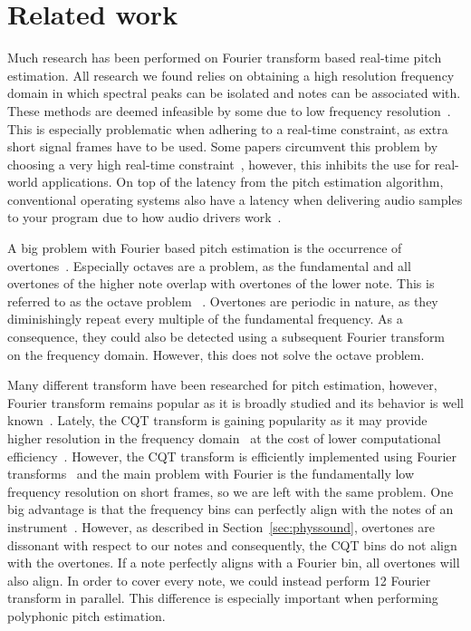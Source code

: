 \documentclass[a4paper,10pt,twocolumn]{article}
\begin{document}
\section{Related work}  \label{sec:related}
Much research has been performed on Fourier transform based real-time pitch estimation. All research we found relies on obtaining a high resolution frequency domain in which spectral peaks can be isolated and notes can be associated with. These methods are deemed infeasible by some due to low frequency resolution~\cite{fourierlimit}.%
This is especially problematic when adhering to a real-time constraint, as extra short signal frames have to be used. Some papers circumvent this problem by choosing a very high real-time constraint~\cite{sloomboi, sloomboi2}, however, this inhibits the use for real-world applications. On top of the latency from the pitch estimation algorithm, conventional operating systems also have a latency when delivering audio samples to your program due to how audio drivers work~\cite{oslatency}.

A big problem with Fourier based pitch estimation is the occurrence of overtones~\cite{oud}. Especially octaves are a problem, as the fundamental and all overtones of the higher note overlap with overtones of the lower note. This is referred to as the octave problem~
\cite{octave}. Overtones are periodic in nature, as they diminishingly repeat every multiple of the fundamental frequency. As a consequence, they could also be detected using a subsequent Fourier transform~\cite{doublefourier} on the frequency domain. However, this does not solve the octave problem.

Many different transform have been researched for pitch estimation, however, Fourier transform remains popular as it is broadly studied and its behavior is well known~\cite{survey}. Lately, the CQT transform is gaining popularity as it may provide higher resolution in the frequency domain~\cite{cqtres} at the cost of lower computational efficiency~\cite{cqtslow}. However, the CQT transform is efficiently implemented using Fourier transforms~\cite{cqtfft} and the main problem with Fourier is the fundamentally low frequency resolution on short frames, so we are left with the same problem. One big advantage is that the frequency bins can perfectly align with the notes of an instrument~\cite{cqtalign}. However, as described in Section~\ref{sec:physsound}, overtones are dissonant with respect to our notes and consequently, the CQT bins do not align with the overtones. If a note perfectly aligns with a Fourier bin, all overtones will also align. In order to cover every note, we could instead perform 12 Fourier transform in parallel. This difference is especially important when performing polyphonic pitch estimation.
\end{document}
